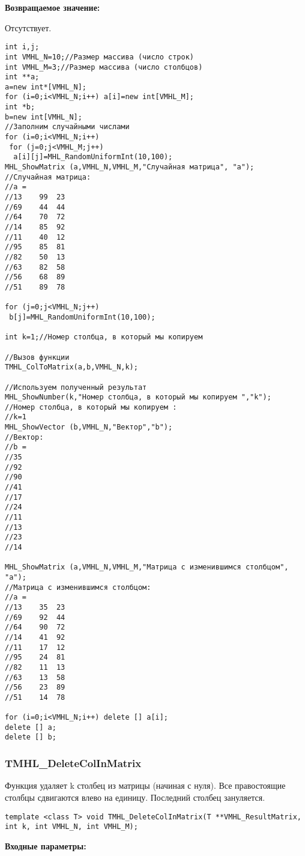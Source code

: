 \documentclass[a4paper,12pt]{article}
\begin{document}
\textbf{Возвращаемое значение:}

Отсутствует.


\begin{lstlisting}[label=code_use_TMHL_ColToMatrix,caption=Пример использования]
int i,j;
int VMHL_N=10;//Размер массива (число строк)
int VMHL_M=3;//Размер массива (число столбцов)
int **a;
a=new int*[VMHL_N];
for (i=0;i<VMHL_N;i++) a[i]=new int[VMHL_M];
int *b;
b=new int[VMHL_N];
//Заполним случайными числами
for (i=0;i<VMHL_N;i++)
 for (j=0;j<VMHL_M;j++)
  a[i][j]=MHL_RandomUniformInt(10,100);
MHL_ShowMatrix (a,VMHL_N,VMHL_M,"Случайная матрица", "a");
//Случайная матрица:
//a =
//13	99	23
//69	44	44
//64	70	72
//14	85	92
//11	40	12
//95	85	81
//82	50	13
//63	82	58
//56	68	89
//51	89	78

for (j=0;j<VMHL_N;j++)
 b[j]=MHL_RandomUniformInt(10,100);

int k=1;//Номер столбца, в который мы копируем

//Вызов функции
TMHL_ColToMatrix(a,b,VMHL_N,k);

//Используем полученный результат
MHL_ShowNumber(k,"Номер столбца, в который мы копируем ","k");
//Номер столбца, в который мы копируем :
//k=1
MHL_ShowVector (b,VMHL_N,"Вектор","b");
//Вектор:
//b =
//35
//92
//90
//41
//17
//24
//11
//13
//23
//14

MHL_ShowMatrix (a,VMHL_N,VMHL_M,"Матрица с изменившимся столбцом", "a");
//Матрица с изменившимся столбцом:
//a =
//13	35	23
//69	92	44
//64	90	72
//14	41	92
//11	17	12
//95	24	81
//82	11	13
//63	13	58
//56	23	89
//51	14	78

for (i=0;i<VMHL_N;i++) delete [] a[i];
delete [] a;
delete [] b;
\end{lstlisting}

\subsubsection{TMHL\_DeleteColInMatrix}\label{TMHL_DeleteColInMatrix}

Функция удаляет k столбец из матрицы (начиная с нуля). Все правостоящие столбцы сдвигаются влево  на единицу. Последний столбец зануляется.


\begin{lstlisting}[label=code_syntax_TMHL_DeleteColInMatrix,caption=Синтаксис]
template <class T> void TMHL_DeleteColInMatrix(T **VMHL_ResultMatrix, int k, int VMHL_N, int VMHL_M);
\end{lstlisting}

\textbf{Входные параметры:}  
 
\end{document}
